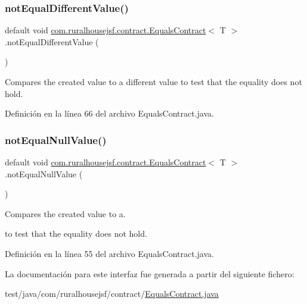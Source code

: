 \subsubsection{\texorpdfstring{notEqualDifferentValue()}{notEqualDifferentValue()}}
{\footnotesize\ttfamily default void \mbox{\hyperlink{a00240}{com.\+ruralhousejsf.\+contract.\+Equals\+Contract}}$<$ T $>$.not\+Equal\+Different\+Value (\begin{DoxyParamCaption}{ }\end{DoxyParamCaption})}



Compares the created value to a different value to test that the equality does not hold. 



Definición en la línea 66 del archivo Equals\+Contract.\+java.

\mbox{\label{a00240_adda6a50dc1babeb3783fd92a09aac788}} 
\subsubsection{\texorpdfstring{notEqualNullValue()}{notEqualNullValue()}}
{\footnotesize\ttfamily default void \mbox{\hyperlink{a00240}{com.\+ruralhousejsf.\+contract.\+Equals\+Contract}}$<$ T $>$.not\+Equal\+Null\+Value (\begin{DoxyParamCaption}{ }\end{DoxyParamCaption})}



Compares the created value to a. 


\begin{DoxyCode}{0}
\DoxyCodeLine{\textcolor{keyword}{null} }
\end{DoxyCode}
 to test that the equality does not hold. 

Definición en la línea 55 del archivo Equals\+Contract.\+java.



La documentación para este interfaz fue generada a partir del siguiente fichero\+:\begin{DoxyCompactItemize}
\item 
test/java/com/ruralhousejsf/contract/\mbox{\hyperlink{a00086}{Equals\+Contract.\+java}}\end{DoxyCompactItemize}
